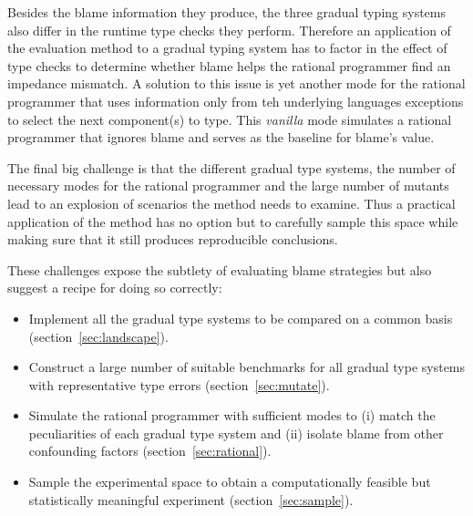 Besides the blame information they produce, the three gradual typing
systems also differ in the runtime type checks they perform. Therefore an
application of the evaluation method to a gradual typing system has to
factor in the effect of type checks to determine whether blame helps the
rational programmer find an impedance mismatch. A solution to this issue
is yet another mode for the rational programmer that uses information only
from teh underlying languages exceptions to select the next component(s) to type.
This \emph{vanilla} mode simulates a rational programmer that ignores
blame and serves as the baseline for blame's value.


The final big challenge is that the different gradual type
systems, the number of necessary modes for the rational programmer
and the large number of mutants lead to an explosion of scenarios the
method needs to examine. Thus a practical application of the
method has no option but to carefully sample this space while 
making sure that it still produces reproducible conclusions.


\smallskip

These challenges expose the subtlety of evaluating blame strategies but
also suggest a recipe for doing so correctly:

\begin{itemize}

\item Implement all the gradual type systems to be compared on a common
  basis (section~\ref{sec:landscape}).

\item Construct a large number of suitable benchmarks for all gradual type
  systems with representative
  type errors  (section~\ref{sec:mutate}). 
    
\item Simulate the rational programmer with sufficient 
  modes to (i) match the peculiarities of each gradual type system and 
    (ii) isolate blame from other confounding factors
    (section~\ref{sec:rational}).



\item Sample the experimental space  to obtain a computationally feasible
  but statistically meaningful experiment (section~\ref{sec:sample}).

\end{itemize}
